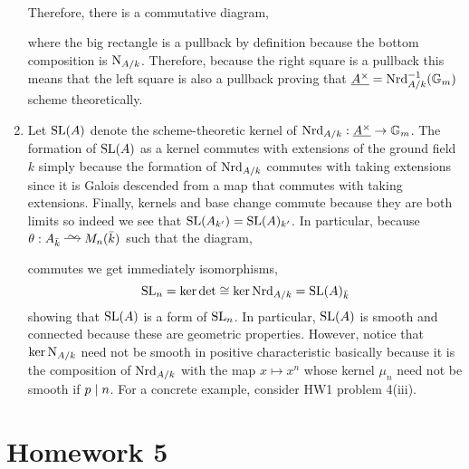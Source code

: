 \documentclass[12pt]{article}
\begin{document}
\begin{enumerate}
\bigskip\\
Therefore, there is a commutative diagram,
\begin{center}
\end{center}
where the big rectangle is a pullback by definition because the bottom composition is $\mathrm{N}_{A/k}$. Therefore, because the right square is a pullback this means that the left square is also a pullback proving that $\underline{A^\times} = \mathrm{Nrd}_{A/k}^{-1}(\mathbb{G}_m)$ scheme theoretically.

\item Let $\mathrm{SL}(A)$ denote the scheme-theoretic kernel of $\mathrm{Nrd}_{A/k} : \underline{A^\times} \to \mathbb{G}_m$. The formation of $\mathrm{SL}(A)$ as a kernel commutes with extensions of the ground field $k$ simply because the formation of $\mathrm{Nrd}_{A/k}$ commutes with taking extensions since it is Galois descended from a map that commutes with taking extensions. Finally, kernels and base change commute because they are both limits so indeed we see that $\mathrm{SL}(A_{k'}) = \mathrm{SL}(A)_{k'}$. In particular, because $\theta : A_{\bar{k}} \iso M_n(\bar{k})$ such that the diagram,
\begin{center}
\end{center}
commutes we get immediately isomorphisms,
\[ \mathrm{SL}_n = \ker{\det} \cong \ker{\mathrm{Nrd}_{A/k}} = \mathrm{SL}(A)_{\bar{k}} \]
showing that $\mathrm{SL}(A)$ is a form of $\mathrm{SL}_n$. In particular, $\mathrm{SL}(A)$ is smooth and connected because these are geometric properties. However, notice that $\ker{\mathrm{N}_{A/k}}$ need not be smooth in positive characteristic basically because it is the composition of $\mathrm{Nrd}_{A/k}$ with the map $x \mapsto x^n$ whose kernel $\mu_n$ need not be smooth if $p \mid n$. For a concrete example, consider HW1 problem 4(iii).
\end{enumerate}

\section{Homework 5}
\end{document}
